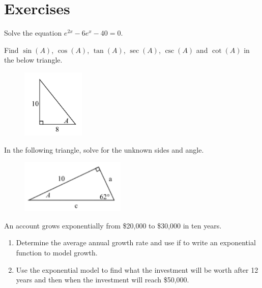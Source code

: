 \section{\large Exercises}

\begin{exer}
    Solve the equation $e^{2x} - 6 e^x - 40 = 0$.
\end{exer}

\begin{exer}
    Find $\sin(A)$, $\cos(A)$, $\tan(A)$, $\sec(A)$, $\csc(A)$ and $\cot(A)$ in the below triangle.
    \begin{figure}[H]
        \center
        \includegraphics[width=3cm]{content/img.png}
    \end{figure}
\end{exer}

\begin{exer}
    In the following triangle, solve for the unknown sides and angle.
    \begin{figure}[H]
        \center
        \includegraphics[width=5cm]{content/img_1.png}
    \end{figure}
\end{exer}

\begin{exer}
    An account grows exponentially from \$20,000 to \$30,000 in ten years.
    \begin{enumerate}
        \item Determine the average annual growth rate and use if to write an exponential function to model growth.
        \item Use the exponential model to find what the investment will be worth after 12 years and then when the investment will reach \$50,000.
    \end{enumerate}
\end{exer}